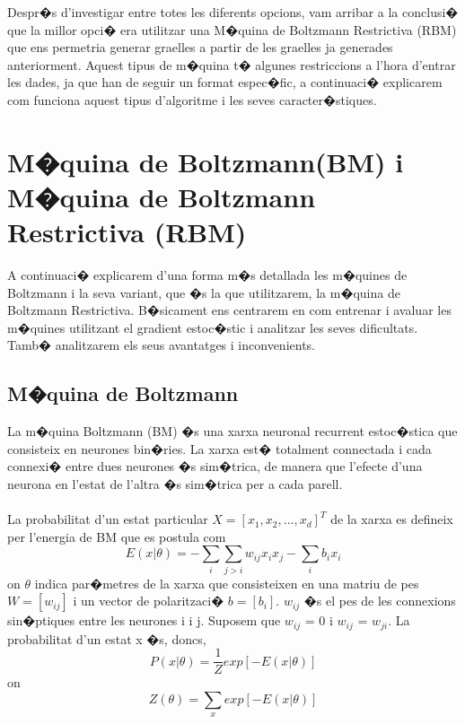 \documentclass[12pt,a4paper,openright,oneside]{article}
\numberwithin{equation}{section}
\theoremstyle{definition}
\begin{document}
Despr�s d'investigar entre totes les diferents opcions, vam arribar a la conclusi� que la millor opci� era utilitzar una M�quina de Boltzmann Restrictiva (RBM) que ens permetria generar graelles a partir de les graelles ja generades anteriorment. Aquest tipus de m�quina t� algunes restriccions a l'hora d'entrar les dades, ja que han de seguir un format espec�fic, a continuaci� explicarem com funciona aquest tipus d'algoritme i les seves caracter�stiques.
\newpage
\section{M�quina de Boltzmann(BM) i M�quina de Boltzmann Restrictiva (RBM)}
A continuaci� explicarem d'una forma m�s detallada les m�quines de Boltzmann i la seva variant, que �s la que utilitzarem, la m�quina de Boltzmann Restrictiva. B�sicament ens centrarem en com entrenar i avaluar les m�quines utilitzant el gradient estoc�stic i analitzar les seves dificultats. Tamb� analitzarem els seus avantatges i inconvenients.
\subsection{M�quina de Boltzmann}
La m�quina Boltzmann (BM) �s una xarxa neuronal recurrent estoc�stica que consisteix en neurones bin�ries. La xarxa est� totalment connectada i cada connexi� entre dues neurones �s sim�trica, de manera que l'efecte d'una neurona en l'estat de l'altra �s sim�trica per a cada parell.\\\\
La probabilitat d'un estat particular ${X = [x_1, x_2,...,x_d]^T}$ de la xarxa es defineix per l'energia de BM que es postula com 
\[E (x | \theta) = -\sum_{i}\sum_{j>i}w_{ij}x_ix_j - \sum_{i}b_ix_i\]
on ${\theta}$ indica par�metres de la xarxa que consisteixen en una matriu de pes ${W = [w_{ij}]}$ i un vector de polaritzaci� ${b = [b_i]}$. ${w_{ij}}$ �s el pes de les connexions sin�ptiques entre les neurones i i j. Suposem que ${w_{ij}}$ = 0 i ${w_{ij}}$ = ${w_{ji}}$. La probabilitat d'un estat x �s, doncs, 
\begin{equation}
P (x | \theta) = \frac{1}{Z}exp[-E(x|\theta)] 
\end{equation}
on
\[Z (\theta) = \sum_{x}exp[-E(x|\theta)]\]
\end{document}
